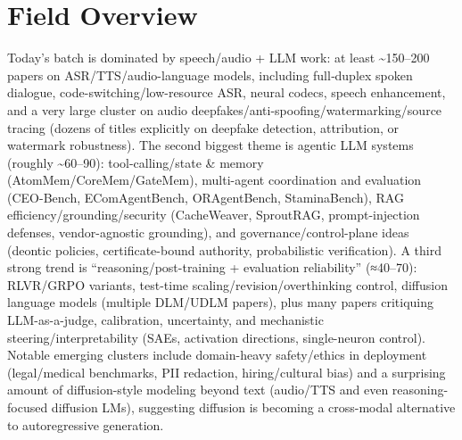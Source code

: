 \documentclass[12pt,letterpaper]{article}
\begin{document}
\medskip



\section*{Field Overview}
{\footnotesize Today's batch is dominated by speech/audio + LLM work: at least \textasciitilde{}150--200 papers on ASR/TTS/audio-language models, including full‑duplex spoken dialogue, code-switching/low-resource ASR, neural codecs, speech enhancement, and a very large cluster on audio deepfakes/anti-spoofing/watermarking/source tracing (dozens of titles explicitly on deepfake detection, attribution, or watermark robustness). The second biggest theme is agentic LLM systems (roughly \textasciitilde{}60--90): tool-calling/state \& memory (AtomMem/CoreMem/GateMem), multi-agent coordination and evaluation (CEO-Bench, EComAgentBench, ORAgentBench, StaminaBench), RAG efficiency/grounding/security (CacheWeaver, SproutRAG, prompt-injection defenses, vendor-agnostic grounding), and governance/control-plane ideas (deontic policies, certificate-bound authority, probabilistic verification). A third strong trend is ``reasoning/post-training + evaluation reliability'' (≈40--70): RLVR/GRPO variants, test-time scaling/revision/overthinking control, diffusion language models (multiple DLM/UDLM papers), plus many papers critiquing LLM-as-a-judge, calibration, uncertainty, and mechanistic steering/interpretability (SAEs, activation directions, single-neuron control). Notable emerging clusters include domain-heavy safety/ethics in deployment (legal/medical benchmarks, PII redaction, hiring/cultural bias) and a surprising amount of diffusion-style modeling beyond text (audio/TTS and even reasoning-focused diffusion LMs), suggesting diffusion is becoming a cross-modal alternative to autoregressive generation.}
\end{document}
